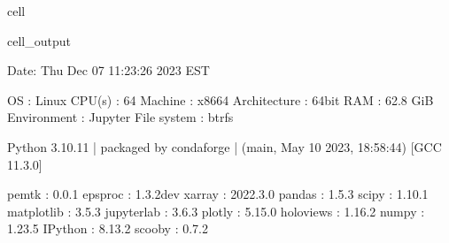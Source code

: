 \documentclass[letterpaper,table,10pt,english]{jupyterBook}
\begin{document}
\begin{sphinxuseclass}{cell}
\begin{sphinxVerbatimOutput}
\begin{sphinxuseclass}{cell_output}
\begin{sphinxVerbatim}[commandchars=\\\{\}]
\PYGZhy{}\PYGZhy{}\PYGZhy{}\PYGZhy{}\PYGZhy{}\PYGZhy{}\PYGZhy{}\PYGZhy{}\PYGZhy{}\PYGZhy{}\PYGZhy{}\PYGZhy{}\PYGZhy{}\PYGZhy{}\PYGZhy{}\PYGZhy{}\PYGZhy{}\PYGZhy{}\PYGZhy{}\PYGZhy{}\PYGZhy{}\PYGZhy{}\PYGZhy{}\PYGZhy{}\PYGZhy{}\PYGZhy{}\PYGZhy{}\PYGZhy{}\PYGZhy{}\PYGZhy{}\PYGZhy{}\PYGZhy{}\PYGZhy{}\PYGZhy{}\PYGZhy{}\PYGZhy{}\PYGZhy{}\PYGZhy{}\PYGZhy{}\PYGZhy{}\PYGZhy{}\PYGZhy{}\PYGZhy{}\PYGZhy{}\PYGZhy{}\PYGZhy{}\PYGZhy{}\PYGZhy{}\PYGZhy{}\PYGZhy{}\PYGZhy{}\PYGZhy{}\PYGZhy{}\PYGZhy{}\PYGZhy{}\PYGZhy{}\PYGZhy{}\PYGZhy{}\PYGZhy{}\PYGZhy{}\PYGZhy{}\PYGZhy{}\PYGZhy{}\PYGZhy{}\PYGZhy{}\PYGZhy{}\PYGZhy{}\PYGZhy{}\PYGZhy{}\PYGZhy{}\PYGZhy{}\PYGZhy{}\PYGZhy{}\PYGZhy{}\PYGZhy{}\PYGZhy{}\PYGZhy{}\PYGZhy{}\PYGZhy{}\PYGZhy{}
  Date: Thu Dec 07 11:23:26 2023 EST

                OS : Linux
            CPU(s) : 64
           Machine : x86\PYGZus{}64
      Architecture : 64bit
               RAM : 62.8 GiB
       Environment : Jupyter
       File system : btrfs

  Python 3.10.11 | packaged by conda\PYGZhy{}forge | (main, May 10 2023, 18:58:44)
  [GCC 11.3.0]

             pemtk : 0.0.1
           epsproc : 1.3.2\PYGZhy{}dev
            xarray : 2022.3.0
            pandas : 1.5.3
             scipy : 1.10.1
        matplotlib : 3.5.3
        jupyterlab : 3.6.3
            plotly : 5.15.0
         holoviews : 1.16.2
             numpy : 1.23.5
           IPython : 8.13.2
            scooby : 0.7.2
\PYGZhy{}\PYGZhy{}\PYGZhy{}\PYGZhy{}\PYGZhy{}\PYGZhy{}\PYGZhy{}\PYGZhy{}\PYGZhy{}\PYGZhy{}\PYGZhy{}\PYGZhy{}\PYGZhy{}\PYGZhy{}\PYGZhy{}\PYGZhy{}\PYGZhy{}\PYGZhy{}\PYGZhy{}\PYGZhy{}\PYGZhy{}\PYGZhy{}\PYGZhy{}\PYGZhy{}\PYGZhy{}\PYGZhy{}\PYGZhy{}\PYGZhy{}\PYGZhy{}\PYGZhy{}\PYGZhy{}\PYGZhy{}\PYGZhy{}\PYGZhy{}\PYGZhy{}\PYGZhy{}\PYGZhy{}\PYGZhy{}\PYGZhy{}\PYGZhy{}\PYGZhy{}\PYGZhy{}\PYGZhy{}\PYGZhy{}\PYGZhy{}\PYGZhy{}\PYGZhy{}\PYGZhy{}\PYGZhy{}\PYGZhy{}\PYGZhy{}\PYGZhy{}\PYGZhy{}\PYGZhy{}\PYGZhy{}\PYGZhy{}\PYGZhy{}\PYGZhy{}\PYGZhy{}\PYGZhy{}\PYGZhy{}\PYGZhy{}\PYGZhy{}\PYGZhy{}\PYGZhy{}\PYGZhy{}\PYGZhy{}\PYGZhy{}\PYGZhy{}\PYGZhy{}\PYGZhy{}\PYGZhy{}\PYGZhy{}\PYGZhy{}\PYGZhy{}\PYGZhy{}\PYGZhy{}\PYGZhy{}\PYGZhy{}\PYGZhy{}
\end{sphinxVerbatim}

\end{sphinxuseclass}\end{sphinxVerbatimOutput}

\end{sphinxuseclass}
\end{document}
